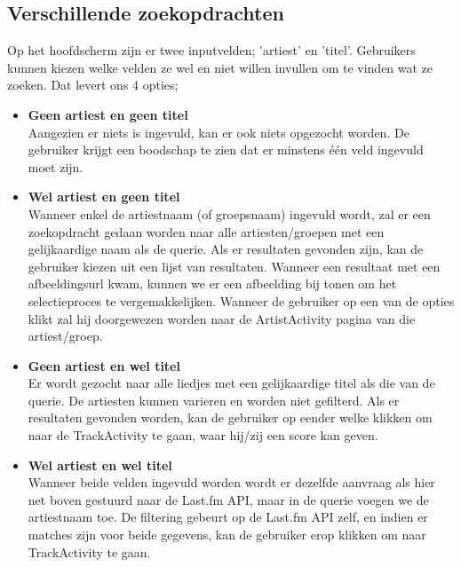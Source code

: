 \documentclass[11pt,a4paper]{article}
\begin{document}
	\subsection{Verschillende zoekopdrachten}
	\label{sec:Verschillende zoekopdrachten}
	Op het hoofdscherm zijn er twee inputvelden; 'artiest' en 'titel'. Gebruikers kunnen kiezen welke velden ze wel en niet willen invullen om te vinden wat ze zoeken. Dat levert ons 4 opties;
		\begin{itemize}
			\item \textbf{Geen artiest en geen titel} \\
		Aangezien er niets is ingevuld, kan er ook niets opgezocht worden. De gebruiker krijgt een boodschap te zien dat er minstens één veld ingevuld moet zijn. \\
		
			\item \textbf{Wel artiest en geen titel} \\
		Wanneer enkel de artiestnaam (of groepsnaam) ingevuld wordt, zal er een zoekopdracht gedaan worden naar alle artiesten/groepen met een gelijkaardige naam als de querie. Als er resultaten gevonden zijn, kan de gebruiker kiezen uit een lijst van resultaten. Wanneer een resultaat met een afbeeldingsurl kwam, kunnen we er een afbeelding bij tonen om het selectieproces te vergemakkelijken. Wanneer de gebruiker op een van de opties klikt zal hij doorgewezen worden naar de ArtistActivity pagina van die artiest/groep. \\
		
			\item  \textbf{Geen artiest en wel titel} \\
		Er wordt gezocht naar alle liedjes met een gelijkaardige titel als die van de querie. De artiesten kunnen varieren en worden niet gefilterd. Als er resultaten gevonden worden, kan de gebruiker op eender welke klikken om naar de TrackActivity te gaan, waar hij/zij een score kan geven.\\
				
			\item  \textbf{Wel artiest en wel titel} \\
		Wanneer beide velden ingevuld worden wordt er dezelfde aanvraag als hier net boven gestuurd naar de Last.fm API, maar in de querie voegen we de artiestnaam toe. De filtering gebeurt op de Last.fm API zelf, en indien er matches zijn voor beide gegevens, kan de gebruiker erop klikken om naar TrackActivity te gaan.
		\end{itemize}
		
\end{document}
